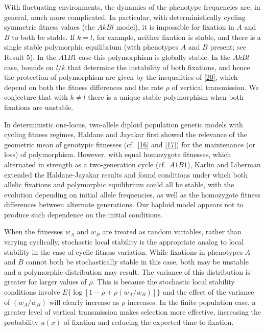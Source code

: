\documentclass[9pt,twocolumn,twoside,lineno]{pnas-new}
\begin{document}
 With fluctuating environments, the dynamics of the phenotype frequencies are, in general, much more complicated. In particular, with deterministically cycling symmetric fitness values (the $AkBl$ model), it is impossible for fixation in $A$ and $B$ to both be stable. If $k=l$, for example, neither fixation is stable, and there is a single stable polymorphic equilibrium (with phenotypes $A$ and $B$ present; see Result 5). In the $A1B1$ case this  polymorphism is globally stable. In the $AkBl$ case, bounds on $l/k$ that determine the instability of both fixations, and hence the protection of polymorphism are given by the inequalities of \eqref{20}, which depend on both the fitness differences and the rate $\rho$ of vertical transmission. We conjecture that with $k\ne l$ there is a unique stable polymorphism when both fixations are unstable.
 
 In deterministic one-locus, two-allele diploid population genetic models with cycling fitness regimes, Haldane and Jayakar \cite{haldane1963polymorphism} first showed the relevance of the geometric mean of genotypic fitnesses (cf.\ \eqref{16} and \eqref{17}) for the maintenance (or loss) of polymorphism. However, with equal homozygote fitnesses, which alternated in strength as a two-generation cycle (cf.\ $A1B1$), Karlin and Liberman \cite{karlin1975random} extended the Haldane-Jayakar results and found conditions under which both allelic fixations and polymorphic equilibrium could all be stable, with the evolution depending on initial allele frequencies, as well as the homozygote fitness differences between alternate generations. Our haploid model appears not to produce such dependence on the initial conditions.
 
 When the fitnesses $w_A$ and $w_B$ are treated as random variables, rather than varying cyclically, stochastic local stability is the appropriate analog to local stability in the case of cyclic fitness variation. While fixations in phenotypes $A$ and $B$ cannot both be stochastically stable in this case, both may be unstable and a polymorphic distribution may result. The variance of this distribution is greater for larger values of $\rho$. This is because the  stochastic local stability conditions involve $E\bigl\{\log[1-\rho+\rho(w_A/w_B)]\bigr\}$ and the effect of the variance of $(w_A/w_B)$ will clearly increase as $\rho$ increases. In the finite population case, a greater level of vertical transmission makes selection more effective, increasing the probability $u(x)$ of fixation and reducing the expected time to fixation.
 
\end{document}
